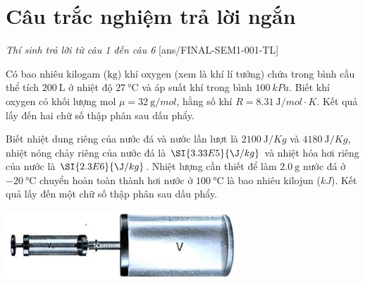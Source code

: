 \section{Câu trắc nghiệm trả lời ngắn} \textit{Thí sinh trả lời từ câu 1 đến câu 6}
\setcounter{ex}{0}
[ans/FINAL-SEM1-001-TL]
\begin{ex}
	Có bao nhiêu kilogam ($\si{\kg}$) khí oxygen (xem là khí lí tưởng) chứa trong bình cầu thể tích $\SI{200}{\liter}$ ở nhiệt độ $\SI{27}{\celsius}$ và áp suất khí trong bình $\SI{100}{kPa}$. Biết khí oxygen có khối lượng mol $\mu=\SI{32}{\g/mol}$, hằng số khí $R=\SI{8.31}{\J/mol\cdot K}$. Kết quả lấy đến hai chữ số thập phân sau dấu phẩy.
\end{ex}
\begin{ex}
	Biết nhiệt dung riêng của nước đá và nước lần lượt là $\SI{2100}{\J/Kg}$ và $\SI{4180}{\J/Kg}$, nhiệt nóng chảy riêng của nước đá là $\SI{3.33E5}{\J/kg}$ và nhiệt hóa hơi riêng của nước là $\SI{2.3E6}{\J/kg}$. Nhiệt lượng cần thiết để làm $\SI{2.0}{\g}$ nước đá ở $\SI{-20}{\celsius}$ chuyển hoàn toàn thành hơi nước ở $\SI{100}{\celsius}$ là bao nhiêu kilojun ($\si{kJ}$). Kết quả lấy đến một chữ số thập phân sau dấu phẩy.
\end{ex}
\begin{ex}
	{\includegraphics[scale=0.7]{../figs/FINAL_SEM1_001_5}}
\end{ex}
